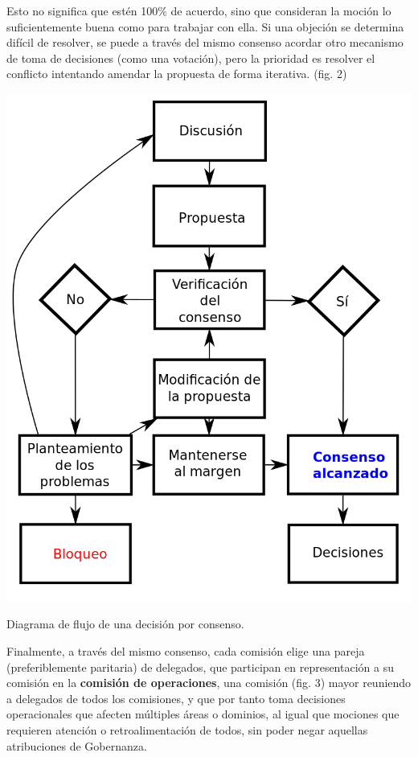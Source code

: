 \documentclass[justified]{tufte-handout} %
\begin{document}
Esto no significa que estén 100\% de acuerdo, sino que consideran la moción lo suficientemente buena como para trabajar con ella. Si una objeción se determina difícil de resolver, se puede a través del mismo consenso acordar otro mecanismo de toma de decisiones (como una votación), pero la prioridad es resolver el conflicto intentando amendar la propuesta de forma iterativa. (fig. 2)
\begin{marginfigure}[-400px]
	\includegraphics[width=\linewidth]{consenso.png}
	\caption{Diagrama de flujo de una decisión por consenso.}
	\label{fig:consenso}
\end{marginfigure}

Finalmente, a través del mismo consenso, cada comisión elige una pareja (preferiblemente paritaria) de delegados, que participan en representación a su comisión en la \textbf{comisión de operaciones}, una comisión (fig. 3) mayor reuniendo a delegados de todos los comisiones, y que por tanto toma decisiones operacionales que afecten múltiples áreas o dominios, al igual que mociones que requieren atención o retroalimentación de todos, sin poder negar aquellas atribuciones de Gobernanza.
\end{document}

